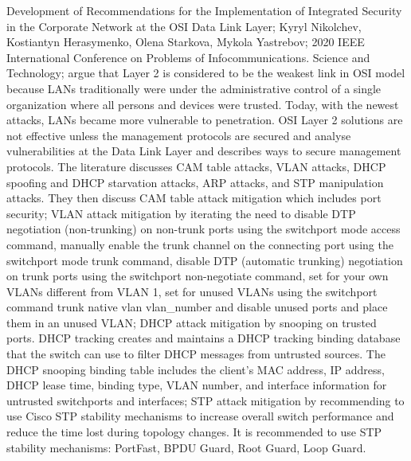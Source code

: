 \documentclass[12pt]{article}
\begin{document}
Development of Recommendations for the Implementation of Integrated Security in the Corporate Network at the OSI Data Link Layer; Kyryl Nikolchev, Kostiantyn Herasymenko, Olena Starkova, Mykola Yastrebov; 2020 IEEE International Conference on  Problems of Infocommunications. Science and Technology; argue that Layer 2 is considered to be the weakest link in OSI   model   because   LANs   traditionally   were   under   the   administrative  control  of  a  single  organization  where  all  persons  and  devices  were  trusted.  Today,  with  the  newest  attacks,  LANs  became  more  vulnerable  to  penetration.  OSI  Layer  2  solutions  are  not  effective  unless  the  management  protocols  are  secured and analyse  vulnerabilities  at  the    Data    Link    Layer    and    describes    ways    to    secure    management protocols. The literature discusses CAM table attacks, VLAN attacks, DHCP spoofing and DHCP starvation attacks, ARP attacks, and STP manipulation attacks. They then discuss CAM table attack mitigation which includes port security; VLAN attack mitigation by iterating the need to  disable  DTP  negotiation  (non-trunking)  on  non-trunk  ports  using  the  switchport  mode  access  command,  manually  enable  the  trunk  channel  on  the  connecting  port  using  the  switchport  mode  trunk  command,  disable  DTP  (automatic  trunking)  negotiation  on  trunk  ports  using  the  switchport   non-negotiate   command,   set   for   your   own   VLANs  different  from  VLAN  1,  set  for  unused  VLANs  using    the    switchport    command    trunk    native    vlan    vlan\_number  and  disable  unused  ports  and  place  them  in  an unused VLAN; DHCP attack mitigation by snooping  on  trusted   ports.   DHCP   tracking   creates   and   maintains   a   DHCP tracking binding database that the switch can use to filter  DHCP  messages  from  untrusted  sources.  The  DHCP  snooping  binding  table  includes  the  client's  MAC  address,  IP   address,   DHCP   lease   time,   binding   type,   VLAN   number,     and     interface     information     for     untrusted     switchports and interfaces; STP attack mitigation by  recommending  to  use  Cisco STP stability mechanisms to increase overall switch performance  and  reduce  the  time  lost  during  topology  changes.    It    is    recommended    to    use    STP    stability mechanisms:  PortFast,  BPDU  Guard,  Root  Guard,  Loop  Guard.
\\ \\
\end{document}
